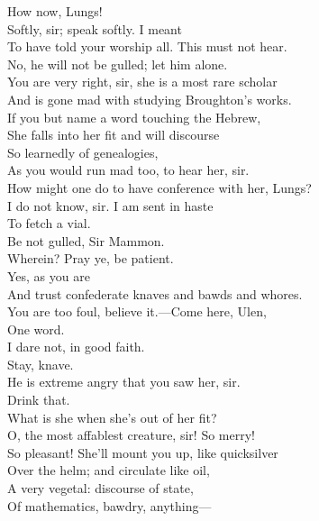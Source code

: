 \documentclass[a4paper,oneside,12pt]{memoir}
\begin{document}
\begin{drama*}
How now, Lungs!\\
\facespeaks {} Softly, sir; speak softly. I meant\\
To have told your worship all. This must not hear.\\
\mammonspeaks No, he will not be gulled; let him alone.\\
\facespeaks You are very right, sir, she is a most rare scholar\\
And is gone mad with studying Broughton's works.\\
If you but name a word touching the Hebrew,\\
She falls into her fit and will discourse\\
So learnedly of genealogies,\\
As you would run mad too, to hear her, sir.\\
\mammonspeaks How might one do to have conference with her, Lungs?\\
\facespeaks I do not know, sir. I am sent in haste\\
To fetch a vial.\\
\surlyspeaks {} Be not gulled, Sir Mammon.\\
\mammonspeaks Wherein? Pray ye, be patient.\\
\surlyspeaks {} Yes, as you are\\
And trust confederate knaves and bawds and whores.\\
\mammonspeaks You are too foul, believe it.---Come here, Ulen,\\
One word.\\
\facespeaks {} I dare not, in good faith.\\
\mammonspeaks {} Stay, knave.\\
\facespeaks He is extreme angry that you saw her, sir.\\
\mammonspeaks Drink that.\\
 What is she when she's out of her fit?\\
\facespeaks O, the most affablest creature, sir! So merry!\\
So pleasant! She'll mount you up, like quicksilver\\
Over the helm; and circulate like oil,\\
A very vegetal: discourse of state,\\
Of mathematics, bawdry, anything---\\

\end{drama*}
\end{document}

